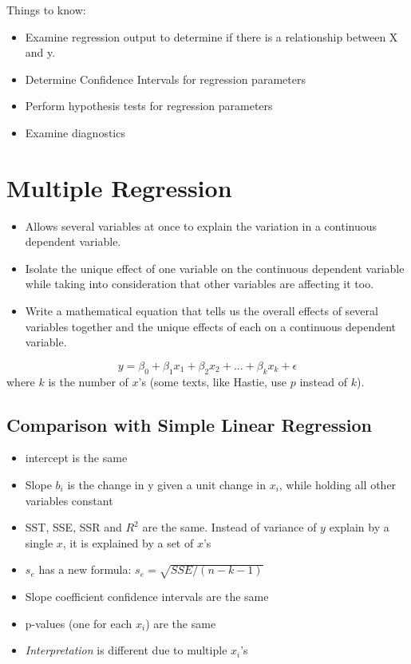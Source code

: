\documentclass[11pt, oneside]{article}   	%
\begin{document}
Things to know:

\begin{itemize}
\item{Examine regression output to determine if there is a relationship between X and y.}
\item{Determine Confidence Intervals for regression parameters}
\item{Perform hypothesis tests for regression parameters}
\item{Examine diagnostics}
\end{itemize}

\section{Multiple Regression}
\begin{itemize}

\item{Allows several variables at once to explain the variation in a continuous dependent variable. }

\item{Isolate the unique effect of one variable on the
continuous dependent variable while taking into
consideration that other variables are affecting it too.}

\item{Write a mathematical equation that tells us the overall
effects of several variables together and the unique
effects of each on a continuous dependent variable.}

\end{itemize}

\[
y = \beta_0 + \beta_1 x_1 + \beta_2 x_2 + ... + \beta_k x_k + \epsilon
\]
where $k$ is the number of $x$'s (some texts, like Hastie, use $p$ instead of $k$).

\subsection{Comparison with Simple Linear Regression}

\begin{itemize}
\item{intercept is the same}
\item{Slope $b_i$ is the change in y given a unit change in $x_i$, while holding all other variables constant}
\item{SST, SSE, SSR and $R^2$ are the same. Instead of variance of $y$ explain by a single $x$, it is explained by a set of $x$'s}
\item{$s_e$ has a new formula: $s_e = \sqrt{SSE / (n-k-1)} $}
\item{Slope coefficient confidence intervals are the same}
\item{p-values (one for each $x_i$) are the same}
\item{\textit{Interpretation} is different due to multiple $x_i$'s}
\end{itemize}
\end{document}
